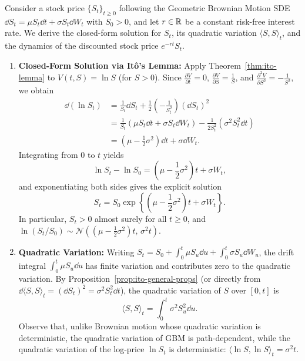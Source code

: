 \begin{example}
\label{ex:gbm-solution-qv}
Consider a stock price $\{S_t\}_{t \ge 0}$ following the Geometric Brownian Motion SDE $\dd S_t = \mu S_t \dd t + \sigma S_t \dd W_t$ with $S_0 > 0$, and let $r \in \mathbb{R}$ be a constant risk-free interest rate. We derive the closed-form solution for $S_t$, its quadratic variation $\langle S, S \rangle_t$, and the dynamics of the discounted stock price $e^{-rt} S_t$.

\begin{enumerate}
    \item \textbf{Closed-Form Solution via It\^o's Lemma:} Apply Theorem~\ref{thm:ito-lemma} to $V(t, S) = \ln S$ (for $S > 0$). Since $\frac{\partial V}{\partial t} = 0$, $\frac{\partial V}{\partial S} = \frac{1}{S}$, and $\frac{\partial^2 V}{\partial S^2} = -\frac{1}{S^2}$, we obtain
    \begin{align*}
    \dd(\ln S_t)
    &= \frac{1}{S_t}\dd S_t + \frac{1}{2}\left(-\frac{1}{S_t^2}\right)(\dd S_t)^2 \\
    &= \frac{1}{S_t}(\mu S_t \dd t + \sigma S_t \dd W_t) - \frac{1}{2 S_t^2}(\sigma^2 S_t^2 \dd t) \\
    &= \left(\mu - \frac{1}{2}\sigma^2\right)\dd t + \sigma \dd W_t.
    \end{align*}
    Integrating from $0$ to $t$ yields
    \[
    \ln S_t - \ln S_0 = \left(\mu - \frac{1}{2}\sigma^2\right) t + \sigma W_t,
    \]
    and exponentiating both sides gives the explicit solution
    \begin{equation}
    \label{eq:gbm-solution}
    S_t = S_0 \exp\left\{\left(\mu - \frac{1}{2}\sigma^2\right)t + \sigma W_t\right\}.
    \end{equation}
    In particular, $S_t > 0$ almost surely for all $t \ge 0$, and $\ln(S_t / S_0) \sim \mathcal{N}\!\left((\mu - \frac{1}{2}\sigma^2)t,\, \sigma^2 t\right)$.

    \item \textbf{Quadratic Variation:} Writing $S_t = S_0 + \int_0^t \mu S_u \dd u + \int_0^t \sigma S_u \dd W_u$, the drift integral $\int_0^t \mu S_u \dd u$ has finite variation and contributes zero to the quadratic variation. By Proposition~\ref{prop:ito-general-props} (or directly from $\dd\langle S, S \rangle_t = (\dd S_t)^2 = \sigma^2 S_t^2 \dd t$), the quadratic variation of $S$ over $[0, t]$ is
    \[
    \langle S, S \rangle_t = \int_0^t \sigma^2 S_u^2 \dd u.
    \]
    Observe that, unlike Brownian motion whose quadratic variation is deterministic, the quadratic variation of GBM is path-dependent, while the quadratic variation of the log-price $\ln S_t$ is deterministic: $\langle \ln S, \ln S \rangle_t = \sigma^2 t$.


\end{enumerate}
\end{example}
